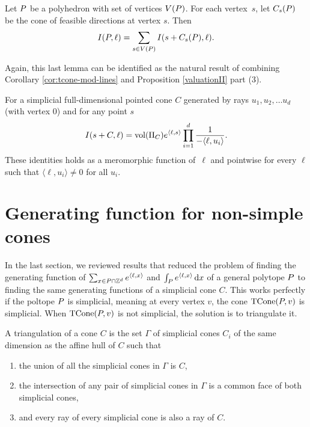 \begin{lemma}  Let ${ P}$ be a polyhedron with set of vertices $V({ P})$. For each
vertex~$s$, let $C_s({ P})$ be the cone of feasible directions at vertex $s$. Then
\begin{equation*}
I({ P},\ell)=\sum_{s\in V({ P})}I(s+C_s({ P}),\ell).
\end{equation*}
\end{lemma}

Again, this last lemma can be identified as the natural result of combining Corollary \ref{cor:tcone-mod-lines} and Proposition \ref{valuationII} part (3).

\begin{proposition} 
  \label{prop:integral-exp-simplicial}
  For a simplicial full-dimensional pointed cone $C$ generated by rays $u_1,u_2,\dots u_d$ (with vertex $0$) and for any point $s$
\begin{equation*}
I(s+C,\ell) = \text{vol} (\Pi_C)e^{{\langle} \ell, s {\rangle}} \prod_{i=1}^d \frac{1}{-{\langle} \ell, u_i {\rangle}}.
\end{equation*}
These identities holds as a meromorphic function of~$\ell$ 
and pointwise for every $\ell$ such that $\langle \ell, u_i \rangle \neq 0$ for
all $u_i$.
\end{proposition}

\section{Generating function for non-simple cones}

In the last section, we reviewed results that reduced the problem of finding the generating function of $\sum_{x \in { P} \cap {\mathbb Z}^d } e^{{\langle} \ell, x {\rangle} }$ and $\int_{ P} e^{{\langle} \ell, x {\rangle}} \,\mathrm{d} x$ of a general polytope ${ P}$ to finding the same generating functions of a simplicial cone $C$. This works perfectly if the poltope ${ P}$ is simplicial, meaning at every vertex $v$, the cone $\operatorname{TCone}({ P}, v)$ is simplicial. When $\operatorname{TCone}({ P}, v)$ is not simplicial, the solution is to triangulate it.

\begin{definition}
A triangulation of a cone $C$ is the set $\Gamma$ of simplicial cones $C_i$ of the same dimension as the affine hull of $C$ such that
\begin{enumerate}
\item the union of all the simplicial cones in $\Gamma$ is $C$,
\item the intersection of any pair of simplicial cones in $\Gamma$ is a common face of both simplicial cones,
\item and every ray of every simplicial cone is also a ray of $C$.
\end{enumerate}
\end{definition}
  
